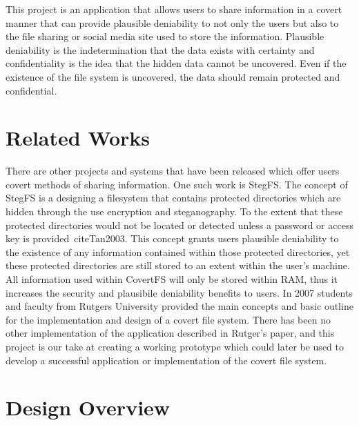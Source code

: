 \documentclass[12pt,journal,compsoc]{IEEEtran}
\begin{document}
This project is an application that allows users to share information in a covert manner that can provide plausible deniability to not only the users but also to the file sharing or social media site used to store the information. Plausible deniability is the indetermination that the data exists with certainty and confidentiality is the idea that the hidden data cannot be uncovered\cite{Baliga2007}. Even if the existence of the file system is uncovered, the data should remain protected and confidential. 

\section{Related Works}
There are other projects and systems that have been released which offer users covert methods of sharing information. One such work is StegFS\cite{Tan2003}.  The concept of StegFS is a designing a filesystem that contains protected directories which are hidden through the use encryption and steganography. To the extent that these protected directories would not be located or detected unless a password or access key is provided~cite{Tan2003}. This concept grants users plausible deniability to the existence of any information contained within those protected directories, yet these protected directories are still stored to an extent within the user's machine. All information used within CovertFS will only be stored within RAM, thus it increases the security and plausibile deniability benefits to users.
 In 2007 students and faculty from Rutgers University provided the main concepts and basic outline for the implementation and design of a covert file system\cite{Baliga2007}.  There has been no other implementation of the application described in Rutger's paper, and this project is our take at creating a working prototype which could later be used to develop a successful application or implementation of the covert file system.


\section{Design Overview}
\end{document}
